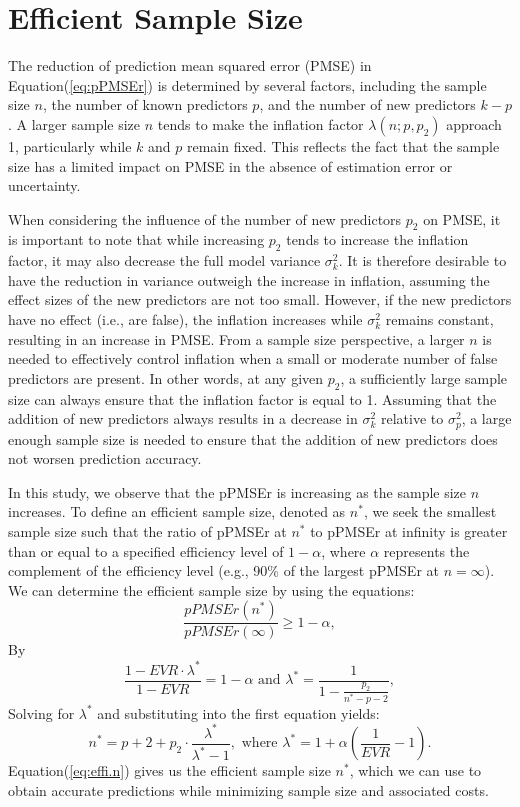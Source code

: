 \section{Efficient Sample Size}

The reduction of prediction mean squared error (PMSE) in Equation(\ref{eq:pPMSEr}) is determined by several factors, including the sample size $n$, the number of known predictors $p$, and the number of new predictors $k-p$. A larger sample size $n$ tends to make the inflation factor $\lambda(n;p,p_2)$ approach 1, particularly while $k$ and $p$ remain fixed. This reflects the fact that the sample size has a limited impact on PMSE in the absence of estimation error or uncertainty.

When considering the influence of the number of new predictors $p_2$ on PMSE, it is important to note that while increasing $p_2$ tends to increase the inflation factor, it may also decrease the full model variance $\sigma_k^2$. It is therefore desirable to have the reduction in variance outweigh the increase in inflation, assuming the effect sizes of the new predictors are not too small. However, if the new predictors have no effect (i.e., are false), the inflation increases while $\sigma_k^2$ remains constant, resulting in an increase in PMSE. From a sample size perspective, a larger $n$ is needed to effectively control inflation when a small or moderate number of false predictors are present. In other words, at any given $p_2$, a sufficiently large sample size can always ensure that the inflation factor is equal to 1. Assuming that the addition of new predictors always results in a decrease in $\sigma_k^2$ relative to $\sigma_p^2$, a large enough sample size is needed to ensure that the addition of new predictors does not worsen prediction accuracy.

In this study, we observe that the pPMSEr is increasing as the sample size $n$ increases. To define an efficient sample size, denoted as $n^*$, we seek the smallest sample size such that the ratio of pPMSEr at $n^*$ to pPMSEr at infinity is greater than or equal to a specified efficiency level of $1-\alpha$, where $\alpha$ represents the complement of the efficiency level (e.g., 90\% of the largest pPMSEr at $n=\infty$).
We can determine the efficient sample size by using the equations:
$$
\frac{pPMSEr(n^*)}{pPMSEr(\infty)} \geq 1-\alpha, 
$$
By 
$$
\frac{1 - EVR\cdot \lambda^*}{1 - EVR} = 1- \alpha 
\text{ and } 
\lambda^*=\frac{1}{1 - \frac{p_2}{n^*-p-2}},
$$
Solving for $\lambda^*$ and substituting into the first equation yields:\begin{equation}
\label{eq:effi.n}
n^* = p+2 + p_2 \cdot \frac{\lambda^*}{\lambda^*-1}, \text{ where } 
\lambda^*= 1+ \alpha(\frac{1}{EVR} - 1 ). 
\end{equation}
Equation(\ref{eq:effi.n}) gives us the efficient sample size $n^*$, which we can use to obtain accurate predictions while minimizing sample size and associated costs.

